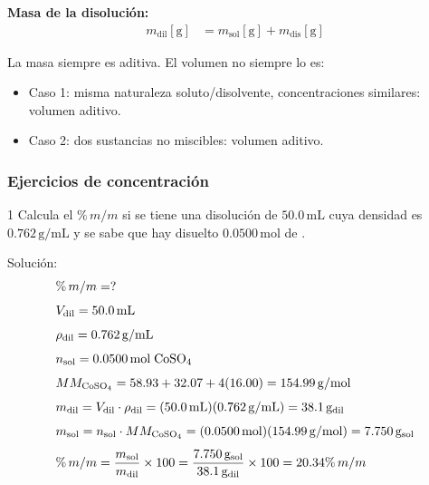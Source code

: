 \textbf{Masa de la disolución:}
\begin{align*}
    m_{\mathrm{dil}}[\mathrm{g}] &= m_{\mathrm{sol}}[\mathrm{g}] + m_{\mathrm{dis}}[\mathrm{g}]
\end{align*}

La masa siempre es aditiva. El volumen no siempre lo es:
\begin{itemize}
    \item Caso 1: misma naturaleza soluto/disolvente, concentraciones similares: volumen aditivo.
    \item Caso 2: dos sustancias no miscibles: volumen aditivo.
\end{itemize}

{}
\subsubsection*{\textcolor{blueunam}{Ejercicios de concentración}}

\begin{exercise}{1}{}
Calcula el $\%\,m/m$ si se tiene una disolución de $50.0\,\mathrm{mL}$ cuya densidad es $0.762\,\mathrm{g/mL}$ y se sabe que hay disuelto $0.0500\,\mathrm{mol}$ de .

Solución:
\begin{align*}
    &\%\,m/m = ? \\[4pt]
    &V_{\mathrm{dil}} = 50.0\,\mathrm{mL} \\[4pt]
    &\rho_{\mathrm{dil}} = 0.762\,\mathrm{g/mL} \\[4pt]
    &n_{\mathrm{sol}} = 0.0500\,\mathrm{mol}\;\ce{CoSO4} \\[4pt]
    &MM_{\mathrm{CoSO_4}} = 58.93 + 32.07 + 4(16.00) = 154.99\,\mathrm{g/mol} \\[4pt]
    &m_{\mathrm{dil}} = V_{\mathrm{dil}} \cdot \rho_{\mathrm{dil}}
        = (50.0\,\mathrm{mL})(0.762\,\mathrm{g/mL})
        = 38.1\,\mathrm{g}_{\mathrm{dil}} \\[4pt]
    &m_{\mathrm{sol}} = n_{\mathrm{sol}} \cdot MM_{\mathrm{CoSO_4}}
        = (0.0500\,\mathrm{mol})(154.99\,\mathrm{g/mol})
        = 7.750\,\mathrm{g}_{\mathrm{sol}} \\[4pt]
    &\%\,m/m = \frac{m_{\mathrm{sol}}}{m_{\mathrm{dil}}} \times 100
        = \frac{7.750\,\mathrm{g}_{\mathrm{sol}}}{38.1\,\mathrm{g}_{\mathrm{dil}}} \times 100
        = 20.34\%\,m/m
\end{align*}
\end{exercise}

